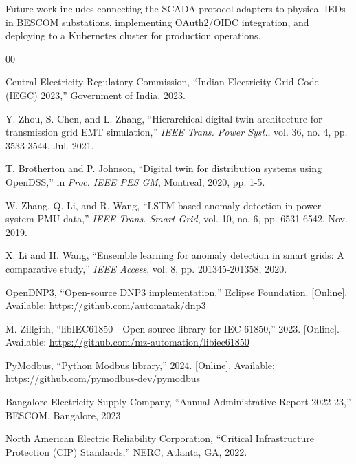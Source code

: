 \documentclass[conference]{IEEEtran}
\begin{document}
Future work includes connecting the SCADA protocol adapters to physical IEDs in BESCOM substations, implementing OAuth2/OIDC integration, and deploying to a Kubernetes cluster for production operations.

\begin{thebibliography}{00}

 Central Electricity Regulatory Commission, ``Indian Electricity Grid Code (IEGC) 2023,'' Government of India, 2023.

 Y. Zhou, S. Chen, and L. Zhang, ``Hierarchical digital twin architecture for transmission grid EMT simulation,'' \textit{IEEE Trans. Power Syst.}, vol. 36, no. 4, pp. 3533-3544, Jul. 2021.

 T. Brotherton and P. Johnson, ``Digital twin for distribution systems using OpenDSS,'' in \textit{Proc. IEEE PES GM}, Montreal, 2020, pp. 1-5.

 W. Zhang, Q. Li, and R. Wang, ``LSTM-based anomaly detection in power system PMU data,'' \textit{IEEE Trans. Smart Grid}, vol. 10, no. 6, pp. 6531-6542, Nov. 2019.

 X. Li and H. Wang, ``Ensemble learning for anomaly detection in smart grids: A comparative study,'' \textit{IEEE Access}, vol. 8, pp. 201345-201358, 2020.

 OpenDNP3, ``Open-source DNP3 implementation,'' Eclipse Foundation. [Online]. Available: \url{https://github.com/automatak/dnp3}

 M. Zillgith, ``libIEC61850 - Open-source library for IEC 61850,'' 2023. [Online]. Available: \url{https://github.com/mz-automation/libiec61850}

 PyModbus, ``Python Modbus library,'' 2024. [Online]. Available: \url{https://github.com/pymodbus-dev/pymodbus}

 Bangalore Electricity Supply Company, ``Annual Administrative Report 2022-23,'' BESCOM, Bangalore, 2023.

 North American Electric Reliability Corporation, ``Critical Infrastructure Protection (CIP) Standards,'' NERC, Atlanta, GA, 2022.

\end{thebibliography}
\end{document}
